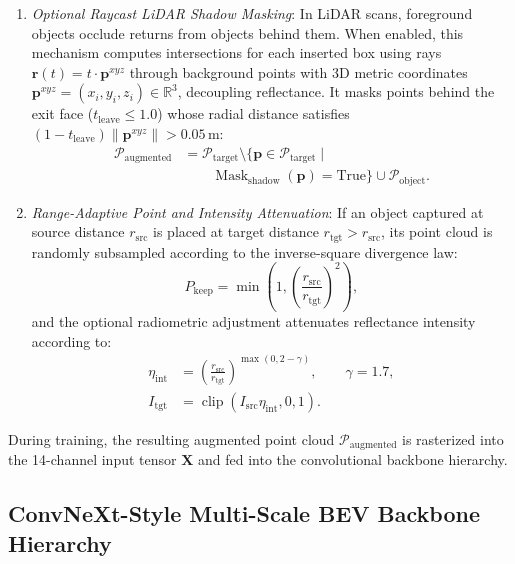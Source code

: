 \begin{enumerate}
\item \textit{Optional Raycast LiDAR Shadow Masking}: In LiDAR scans, foreground objects occlude returns from objects behind them. When enabled, this mechanism computes intersections for each inserted box using rays $\mathbf{r}(t) = t \cdot \mathbf{p}^{xyz}$ through background points with 3D metric coordinates $\mathbf{p}^{xyz} = (x_i, y_i, z_i) \in \mathbb{R}^3$, decoupling reflectance. It masks points behind the exit face ($t_{\mathrm{leave}} \le 1.0$) whose radial distance satisfies $(1 - t_{\mathrm{leave}})\|\mathbf{p}^{xyz}\| > 0.05$\,m:
\begin{equation}
    \begin{aligned}
        \mathcal{P}_{\mathrm{augmented}}
        &= \mathcal{P}_{\mathrm{target}} \setminus
        \{\mathbf{p} \in \mathcal{P}_{\mathrm{target}} \mid \\
        &\qquad \operatorname{Mask}_{\mathrm{shadow}}(\mathbf{p}) = \mathrm{True}\}
        \cup \mathcal{P}_{\mathrm{object}}.
    \end{aligned}
    \label{eq:shadow_mask}
\end{equation}

\item \textit{Range-Adaptive Point and Intensity Attenuation}: If an object captured at source distance $r_{\mathrm{src}}$ is placed at target distance $r_{\mathrm{tgt}} > r_{\mathrm{src}}$, its point cloud is randomly subsampled according to the inverse-square divergence law:
\begin{equation}
    P_{\mathrm{keep}} = \min\left(1, \left(\frac{r_{\mathrm{src}}}{r_{\mathrm{tgt}}}\right)^2\right),
    \label{eq:inverse_square}
\end{equation}
and the optional radiometric adjustment attenuates reflectance intensity according to:
\[
    \begin{aligned}
        \eta_{\mathrm{int}}
        &= \left(\frac{r_{\mathrm{src}}}{r_{\mathrm{tgt}}}\right)^{\max(0, 2 - \gamma)},
        \qquad \gamma = 1.7, \\
        I_{\mathrm{tgt}}
        &= \operatorname{clip}(I_{\mathrm{src}}\eta_{\mathrm{int}}, 0, 1).
    \end{aligned}
\]
\end{enumerate}
During training, the resulting augmented point cloud $\mathcal{P}_{\mathrm{augmented}}$ is rasterized into the 14-channel input tensor $\mathbf{X}$ and fed into the convolutional backbone hierarchy.

\subsection{ConvNeXt-Style Multi-Scale BEV Backbone Hierarchy}
\label{sec:backbone_architecture}

